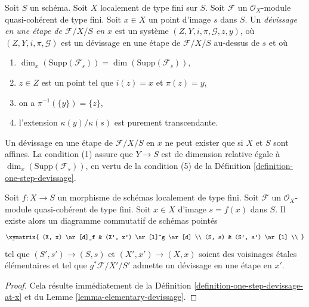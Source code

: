 \begin{definition}
\label{definition-one-step-devissage-at-x}
Soit $S$ un schéma.
Soit $X$ localement de type fini sur $S$.
Soit $\mathcal{F}$ un $\mathcal{O}_X$-module quasi-cohérent de type fini.
Soit $x \in X$ un point d'image $s$ dans $S$.
Un {\it d\'evissage en une étape de $\mathcal{F}/X/S$ en $x$}
est un système $(Z, Y, i, \pi, \mathcal{G}, z, y)$, où
$(Z, Y, i, \pi, \mathcal{G})$ est un d\'evissage en une étape de
$\mathcal{F}/X/S$ au-dessus de $s$ et où
\begin{enumerate}
\item $\dim_x(\text{Supp}(\mathcal{F}_s)) = \dim(\text{Supp}(\mathcal{F}_s))$,
\item $z \in Z$ est un point tel que $i(z) = x$ et $\pi(z) = y$,
\item on a $\pi^{-1}(\{y\}) = \{z\}$,
\item l'extension $\kappa(y)/\kappa(s)$ est purement
transcendante.
\end{enumerate}
\end{definition}

\noindent
Un d\'evissage en une étape de $\mathcal{F}/X/S$ en $x$ ne peut exister que si
$X$ et $S$ sont affines. La condition (1) assure que $Y \to S$ est de
dimension relative égale à $\dim_x(\text{Supp}(\mathcal{F}_s))$,
en vertu de la condition (5) de la
Définition \ref{definition-one-step-devissage}.

\begin{lemma}
\label{lemma-elementary-devissage-variant}
Soit $f : X \to S$ un morphisme de schémas localement de type fini.
Soit $\mathcal{F}$ un $\mathcal{O}_X$-module quasi-cohérent de type fini.
Soit $x \in X$ d'image $s = f(x)$ dans $S$.
Il existe alors un diagramme commutatif de schémas pointés
$$
\xymatrix{
(X, x) \ar[d]_f & (X', x') \ar[l]^g \ar[d] \\
(S, s) & (S', s') \ar[l] \\
}
$$
tel que $(S', s') \to (S, s)$ et $(X', x') \to (X, x)$
soient des voisinages \'etales élémentaires et tel que
$g^*\mathcal{F}/X'/S'$ admette un d\'evissage en une étape en $x'$.
\end{lemma}

\begin{proof}
Cela résulte immédiatement de la
Définition \ref{definition-one-step-devissage-at-x}
et du
Lemme \ref{lemma-elementary-devissage}.
\end{proof}

